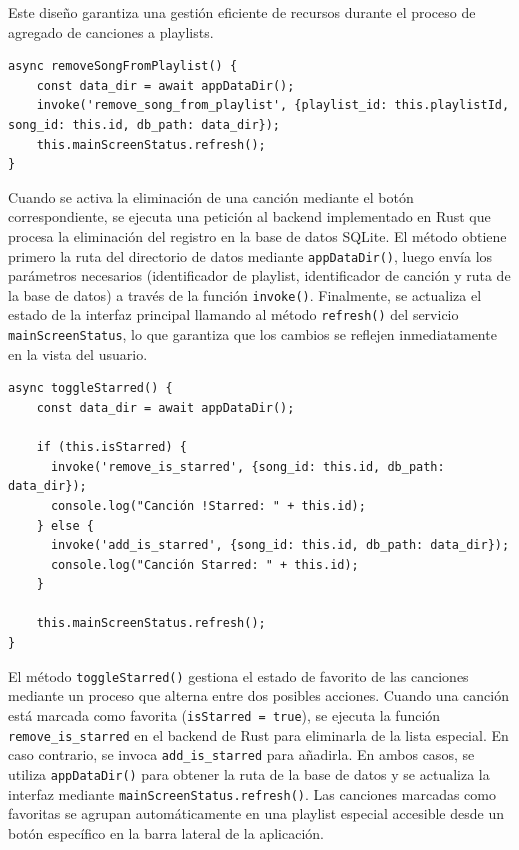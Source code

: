 \documentclass[11pt, a4paper]{article}
\begin{document}
                Este diseño garantiza una gestión eficiente de recursos durante el proceso de agregado de canciones a playlists.

                \begin{lstlisting}[caption={removeSongFromPlaylist()}]
async removeSongFromPlaylist() {
    const data_dir = await appDataDir();
    invoke('remove_song_from_playlist', {playlist_id: this.playlistId, song_id: this.id, db_path: data_dir});
    this.mainScreenStatus.refresh();
}
                \end{lstlisting}

                Cuando se activa la eliminación de una canción mediante el botón correspondiente, se ejecuta una petición al backend implementado en Rust que procesa la eliminación del registro en la base de datos SQLite. El método obtiene primero la ruta del directorio de datos mediante \texttt{appDataDir()}, luego envía los parámetros necesarios (identificador de playlist, identificador de canción y ruta de la base de datos) a través de la función \texttt{invoke()}. Finalmente, se actualiza el estado de la interfaz principal llamando al método \texttt{refresh()} del servicio \texttt{mainScreenStatus}, lo que garantiza que los cambios se reflejen inmediatamente en la vista del usuario.

                \begin{lstlisting}[caption={toggleStarred()}]
async toggleStarred() {
    const data_dir = await appDataDir();
    
    if (this.isStarred) {
      invoke('remove_is_starred', {song_id: this.id, db_path: data_dir});
      console.log("Canción !Starred: " + this.id);
    } else {
      invoke('add_is_starred', {song_id: this.id, db_path: data_dir});
      console.log("Canción Starred: " + this.id);
    }

    this.mainScreenStatus.refresh();
}
                \end{lstlisting}

                El método \texttt{toggleStarred()} gestiona el estado de favorito de las canciones mediante un proceso que alterna entre dos posibles acciones. Cuando una canción está marcada como favorita (\texttt{isStarred = true}), se ejecuta la función \texttt{remove\_is\_starred} en el backend de Rust para eliminarla de la lista especial. En caso contrario, se invoca \texttt{add\_is\_starred} para añadirla. En ambos casos, se utiliza \texttt{appDataDir()} para obtener la ruta de la base de datos y se actualiza la interfaz mediante \texttt{mainScreenStatus.refresh()}. Las canciones marcadas como favoritas se agrupan automáticamente en una playlist especial accesible desde un botón específico en la barra lateral de la aplicación. \\
\end{document}
